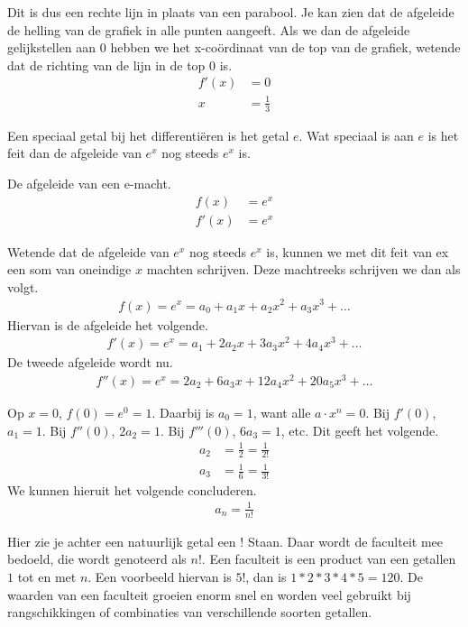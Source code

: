 \documentclass[11pt,fleqn]{book} %
\begin{document}
Dit is dus een rechte lijn in plaats van een parabool. Je kan zien dat de afgeleide de helling van de grafiek in alle punten aangeeft. Als we dan de afgeleide gelijkstellen aan 0 hebben we het x-coördinaat van de top van de grafiek, wetende dat de richting van de lijn in de top 0 is.
\begin{align*}
f'(x) &= 0\\
x &= \frac{1}{3}
\end{align*}

Een speciaal getal bij het differentiëren is het getal $e$. Wat speciaal is aan $e$ is het feit dan de afgeleide van $e^x$ nog steeds $e^x$ is.
\begin{definition}
De afgeleide van een e-macht.
\begin{align*}
f(x) &=e^x\\
f'(x) &=e^x
\end{align*}
\end{definition}

Wetende dat de afgeleide van $e^x$ nog steeds $e^x$ is, kunnen we met dit feit van ex een som van oneindige $x$ machten schrijven. Deze machtreeks schrijven we dan als volgt.
\begin{align*}
f(x)=e^x=a_0+a_1x+a_2x^2+a_3x^3+\ldots
\end{align*}
Hiervan is de afgeleide het volgende.
\begin{align*}
f'(x)=e^x=a_1+2a_2x+3a_3x^2+4a_4x^3+\ldots
\end{align*}
De tweede afgeleide wordt nu.
\begin{align*}
f''(x)=e^x=2a_2+6a_3x+12a_4x^2+20a_5x^3+\ldots
\end{align*}

Op $x=0$, $f(0)=e^0=1$. Daarbij is $a_0=1$, want alle $a\cdot x^n=0$. Bij $f'(0)$, $a_1=1$. Bij $f''(0)$, $2a_2=1$. Bij $f'''(0)$, $6a_3=1$, etc. Dit geeft het volgende.
\begin{align*}
a_2 &=\frac{1}{2}=\frac{1}{2!}\\
a_3 &=\frac{1}{6}=\frac{1}{3!}
\end{align*}
We kunnen hieruit het volgende concluderen.
\begin{align*}
a_n=\frac{1}{n!}
\end{align*}

Hier zie je achter een natuurlijk getal een $!$ Staan. Daar wordt de faculteit mee bedoeld, die wordt genoteerd als $n!$. Een faculteit is een product van een getallen $1$ tot en met $n$. Een voorbeeld hiervan is $5!$, dan is $1*2*3*4*5= 120$. De waarden van een faculteit groeien enorm snel en worden veel gebruikt bij rangschikkingen of combinaties van verschillende soorten getallen.
\end{document}
